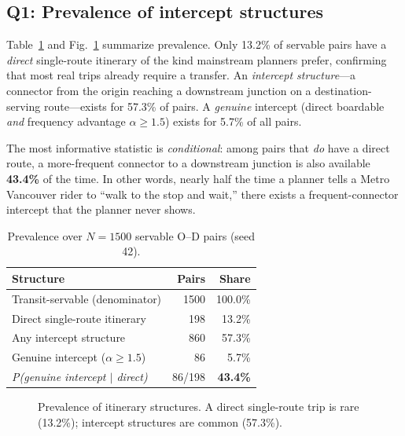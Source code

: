 \documentclass[conference]{IEEEtran}
\begin{document}
\subsection{Q1: Prevalence of intercept structures}
Table~\ref{tab:prev} and Fig.~\ref{fig:prev} summarize prevalence. Only 13.2\% of
servable pairs have a \emph{direct} single-route itinerary of the kind
mainstream planners prefer, confirming that most real trips already require a
transfer. An \emph{intercept structure}---a connector from the origin reaching a
downstream junction on a destination-serving route---exists for 57.3\% of pairs.
A \emph{genuine} intercept (direct boardable \emph{and} frequency advantage
$\alpha\ge1.5$) exists for 5.7\% of all pairs.

The most informative statistic is \emph{conditional}: among pairs that
\emph{do} have a direct route, a more-frequent connector to a downstream junction
is also available \textbf{43.4\%} of the time. In other words, nearly half the
time a planner tells a Metro Vancouver rider to ``walk to the stop and wait,''
there exists a frequent-connector intercept that the planner never shows.

\begin{table}[t]
\caption{Prevalence over $N{=}1500$ servable O--D pairs (seed 42).}
\label{tab:prev}
\centering
\begin{tabular}{lrr}
\toprule
\textbf{Structure} & \textbf{Pairs} & \textbf{Share} \\
\midrule
Transit-servable (denominator)      & 1500 & 100.0\% \\
Direct single-route itinerary       & 198  & 13.2\% \\
Any intercept structure             & 860  & 57.3\% \\
Genuine intercept ($\alpha\ge1.5$)  & 86   & 5.7\% \\
\midrule
\emph{P(genuine intercept $\mid$ direct)} & 86/198 & \textbf{43.4\%} \\
\bottomrule
\end{tabular}
\end{table}

\begin{figure}[t]
\centering
{}
\caption{Prevalence of itinerary structures. A direct single-route trip is rare
(13.2\%); intercept structures are common (57.3\%).}
\label{fig:prev}
\end{figure}
\end{document}
